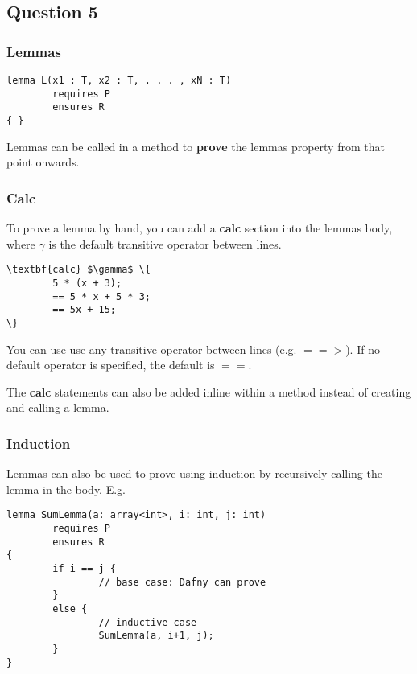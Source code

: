 \subsection{Question 5}

\subsubsection{Lemmas}
\begin{verbatim}
lemma L(x1 : T, x2 : T, . . . , xN : T)
        requires P
        ensures R
{ }
\end{verbatim}

Lemmas can be called in a method to \textbf{prove} the lemmas property from that point onwards.

\subsubsection{Calc}
To prove a lemma by hand, you can add a \textbf{calc} section into the lemmas body, where \textit{$\gamma$} is the default transitive operator between lines.
\begin{Verbatim}[commandchars=\\\{\}, codes={\catcode`$=3\catcode`^=7}]
\textbf{calc} $\gamma$ \{
        5 * (x + 3);
        == 5 * x + 5 * 3;
        == 5x + 15;
\}
\end{Verbatim}

You can use use any transitive operator between lines (e.g. $==>$). If no default operator is specified, the default is $==$.

The \textbf{calc} statements can also be added inline within a method instead of creating and calling a lemma.

\subsubsection{Induction}
Lemmas can also be used to prove using induction by recursively calling the lemma in the body. E.g. \\
\begin{Verbatim}
lemma SumLemma(a: array<int>, i: int, j: int)
        requires P
        ensures R
{
        if i == j {
                // base case: Dafny can prove
        }
        else { 
                // inductive case
                SumLemma(a, i+1, j); 
        }
} 
\end{Verbatim}
